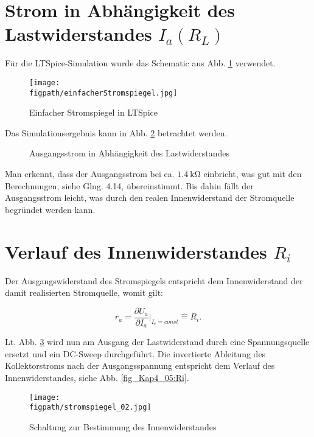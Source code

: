 \section{Strom in Abhängigkeit des Lastwiderstandes $I_a(R_L)$}
Für die LTSpice-Simulation wurde das Schematic aus Abb. \ref{fig_Kap4_02:SpiceSchematic} verwendet. 

\begin{figure}[H]
    \centering
    \texttt{[image: \\figpath/einfacherStromspiegel.jpg]}
    \caption{Einfacher Stromspiegel in LTSpice}
    \label{fig_Kap4_02:SpiceSchematic}
\end{figure}

Das Simulationsergebnis kann in Abb. \ref{fig_Kap4_03:Ia} betrachtet werden.

\begin{figure}[H]
	\centering \small
	\scalebox{0.9}{}
	\caption{Ausgangsstrom in Abhängigkeit des Lastwiderstandes}
	\label{fig_Kap4_03:Ia}
\end{figure}

Man erkennt, dass der Ausgangsstrom bei ca. $\SI{1,4}{\kilo\ohm}$ einbricht, was gut mit den Berechnungen, siehe Glng. 4.14, übereinstimmt. Bis dahin fällt der Ausgangsstrom leicht, was durch den realen Innenwiderstand der Stromquelle begründet werden kann.

\section{Verlauf des Innenwiderstandes $R_i$}
Der Ausgangswiderstand des Stromspiegels entspricht dem Innenwiderstand der damit realisierten Stromquelle, womit gilt:

\begin{equation}
    r_a = \frac{\partial U_a}{\partial I_a}\big|_{I_e = const} \hat{=} R_i .
\end{equation}

Lt. Abb. \ref{fig_Kap4_04:Ri} wird nun am Ausgang der Lastwiderstand durch eine Spannungsquelle ersetzt und ein DC-Sweep durchgeführt. Die invertierte Ableitung des Kollektorstroms nach der Ausgangsspannung entspricht dem Verlauf des Innenwiderstandes, siehe Abb. \ref{fig_Kap4_05:Ri}.

\begin{figure}[H]
    \centering
    \texttt{[image: \\figpath/stromspiegel\_02.jpg]}
    \caption{Schaltung zur Bestimmung des Innenwiderstandes}
    \label{fig_Kap4_04:Ri}
\end{figure}

